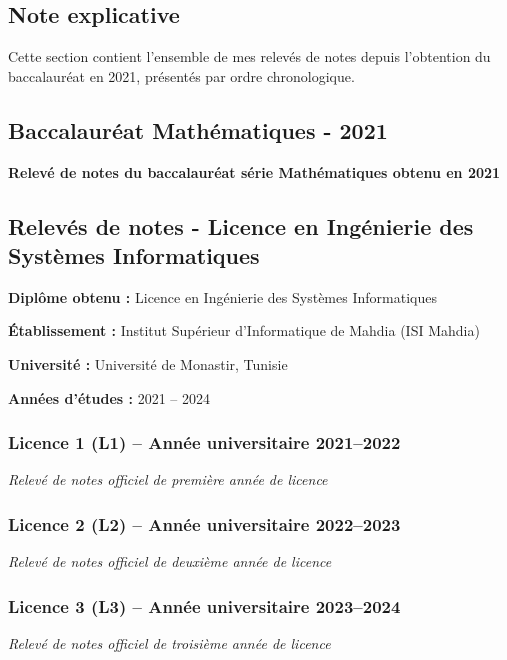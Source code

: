 \documentclass[12pt,a4paper]{article}
\begin{document}
\begin{itemize}
\subsection{Note explicative}
Cette section contient l'ensemble de mes relevés de notes depuis l'obtention du baccalauréat en 2021, présentés par ordre chronologique.

\subsection{Baccalauréat Mathématiques - 2021}
\textbf{Relevé de notes du baccalauréat série Mathématiques obtenu en 2021}



\subsection{Relevés de notes - Licence en Ingénierie des Systèmes Informatiques}

\textbf{Diplôme obtenu :} Licence en Ingénierie des Systèmes Informatiques

\textbf{Établissement :} Institut Supérieur d'Informatique de Mahdia (ISI Mahdia)

\textbf{Université :} Université de Monastir, Tunisie

\textbf{Années d'études :} 2021 – 2024

\subsubsection{Licence 1 (L1) – Année universitaire 2021–2022}
\textit{Relevé de notes officiel de première année de licence}



\subsubsection{Licence 2 (L2) – Année universitaire 2022–2023}
\textit{Relevé de notes officiel de deuxième année de licence}



\subsubsection{Licence 3 (L3) – Année universitaire 2023–2024}
\textit{Relevé de notes officiel de troisième année de licence}


\end{itemize}
\end{document}
